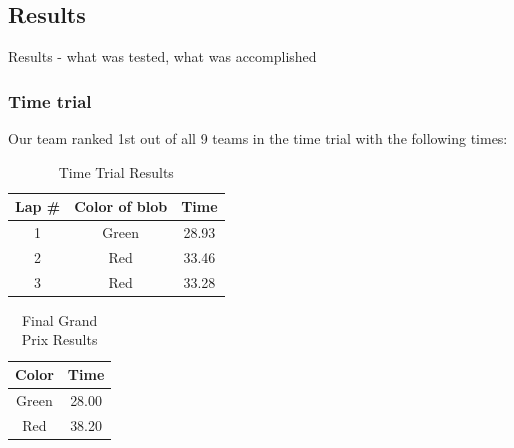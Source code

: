 \documentclass[journal, a4paper]{IEEEtran}
\begin{document}
\subsection{Results}
Results - what was tested, what was accomplished
\subsubsection{Time trial}
Our team ranked 1st out of all 9 teams in the time trial with the following times:
    \begin{table}[!hbt]
        \begin{center}
        \caption{Time Trial Results}
        \begin{tabular}{|c|c|c|}
            \hline
			\textbf{Lap \#} & \textbf{Color of blob} & \textbf{Time} \\
			\hline
            1 & Green & 28.93\\
            \hline
            2 & Red & 33.46 \\
            \hline
            3 & Red & 33.28\\
            \hline
        \end{tabular}
        \end{center}
    \end{table}
    \begin{table}[!hbt]
        \begin{center}
		\caption{Final Grand Prix Results}
        \begin{tabular}{|c|c|}
            \hline
			\textbf{Color} & \textbf{Time} \\
			\hline
            Green & 28.00 \\
            \hline
            Red & 38.20 \\
            \hline
        \end{tabular}
        \end{center}
    \end{table}
\end{document}
